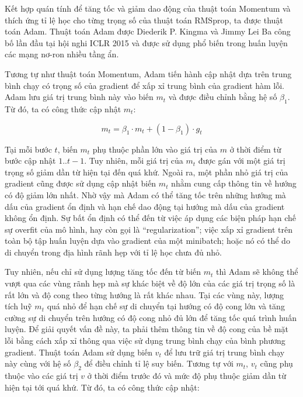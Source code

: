Kết hợp quán tính để tăng tốc và giảm dao động của thuật toán Momentum và thích ứng tỉ lệ học cho từng trọng số của thuật toán RMSprop, ta được thuật toán Adam. Thuật toán Adam \cite{kingma2014adam} được Diederik P. Kingma và Jimmy Lei Ba công bố lần đầu tại hội nghi ICLR 2015 và được sử dụng phổ biến trong huấn luyện các mạng nơ-ron nhiều tầng ẩn.

Tương tự như thuật toán Momentum, Adam tiến hành cập nhật dựa trên trung bình chạy có trọng số của gradient để xấp xỉ trung bình của gradient hàm lỗi. Adam lưu giá trị trung bình này vào biến $m_t$ và được điều chỉnh bằng hệ số $\beta_1$. Từ đó, ta có công thức cập nhật $m_t$:

\begin{equation} \label{eqn:adam-m}
	m_t = \beta_1 \cdot m_t + (1 - \beta_1) \cdot g_t
\end{equation}

Tại mỗi bước $t$, biến $m_t$ phụ thuộc phần lớn vào giá trị của $m$ ở thời điểm từ bước cập nhật $1..t-1$. Tuy nhiên, mỗi giá trị của $m_t$ được gán với một giá trị trọng số giảm dần từ hiện tại đến quá khứ. Ngoài ra, một phần nhỏ giá trị của gradient cũng được sử dụng cập nhật biến $m_t$ nhằm cung cấp thông tin về hướng có độ giảm lớn nhất. Nhờ vậy mà Adam có thể tăng tốc trên những hướng mà dấu của gradient ổn định và hạn chế dao động tại hướng mà dấu của gradient không ổn định. Sự bất ổn định có thể đến từ việc áp dụng các biện pháp hạn chế sự overfit của mô hình, hay còn gọi là ``regularization''; việc xấp xỉ gradient trên toàn bộ tập huấn luyện dựa vào gradient của một minibatch; hoặc nó có thể do di chuyển trong địa hình rãnh hẹp với tỉ lệ học chưa đủ nhỏ.

Tuy nhiên, nếu chỉ sử dụng lượng tăng tốc đến từ biến $m_t$ thì Adam sẽ không thể vượt qua các vùng rãnh hẹp mà sự khác biệt về độ lớn của các giá trị trọng số là rất lớn và độ cong theo từng hướng là rất khác nhau. Tại các vùng này, lượng tích luỹ $m_t$ quá nhỏ để hạn chế sự di chuyển tại hướng có độ cong lớn và tăng cường sự di chuyển trên hướng có độ cong nhỏ đủ lớn để tăng tốc quá trình huấn luyện. Để giải quyết vấn đề này, ta phải thêm thông tin về độ cong của bề mặt lỗi bằng cách xấp xỉ thông qua việc sử dụng trung bình chạy của bình phương gradient. Thuật toán Adam sử dụng biến $v_t$ để lưu trữ giá trị trung bình chạy này cùng với hệ số $\beta_2$ để điều chỉnh tỉ lệ suy biến. Tương tự với $m_t$, $v_t$ cũng phụ thuộc vào các giá trị $v$ ở thời điểm trước đó và mức độ phụ thuộc giảm dần từ hiện tại tới quá khứ. Từ đó, ta có công thức cập nhật:

